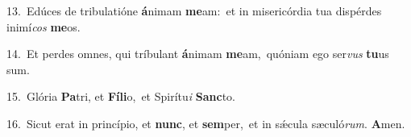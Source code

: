 {\numbfont\textcolor{\numbcolor}{13.}}~Edúces de tribulatióne \textbf{á}\-nimam \textbf{me}\-am:~\star et in misericórdia tua dispérdes inimí\textit{cos} \textbf{me}\-os.\par
{\numbfont\textcolor{\numbcolor}{14.}}~Et perdes omnes, qui tríbulant \textbf{á}\-nimam \textbf{me}\-am,~\star quóniam ego ser\textit{vus} \textbf{tu}\-us sum.\par
{\numbfont\textcolor{\numbcolor}{15.}}~Glória \textbf{Pa}\-tri, et \textbf{Fí}\-\textbf{li}o,~\star et Spirítu\textit{i} \textbf{Sanc}\-to.\par
{\numbfont\textcolor{\numbcolor}{16.}}~Sicut erat in princípio, et \textbf{nunc}\-, et \textbf{sem}\-per,~\star et in sǽcula sæculó\-\textit{rum}\-. \textbf{A}\-men.\par
